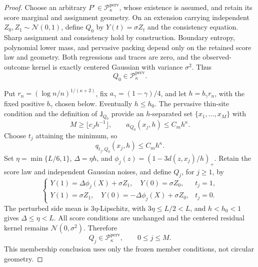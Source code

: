 \documentclass{article}
\begin{document}
\begin{proof}
Choose an arbitrary \(P^\circ\in\mathcal P_{\kappa}^{\mathrm{perv}}\),
whose existence is assumed, and retain its score marginal and assignment
geometry.  On an extension carrying independent
\(Z_0,Z_1\sim\mathcal N(0,1)\), define \(Q_0\) by
\(Y(t)=\sigma Z_t\) and the consistency equation.  Sharp assignment and
consistency hold by construction.  Boundary entropy, polynomial lower
mass, and pervasive packing depend only on the retained score law and
geometry.  Both regressions and traces are zero, and the observed-outcome
kernel is exactly centered Gaussian with variance \(\sigma^2\).  Thus
\[
 Q_0\in\mathcal P_{\kappa}^{\mathrm{perv}}.
 \tag{77}
\]

Put \(r_n=(\log n/n)^{1/(\kappa+2)}\), fix
\(a_\gamma=(1-\gamma)/4\), and let \(h=b_\gamma r_n\), with the fixed
positive \(b_\gamma\) chosen below.  Eventually \(h\le h_0\).  The
pervasive thin-site condition and the definition of \(\mathsf J_{Q_0}\)
provide an \(h\)-separated set \(\{x_1,\ldots,x_M\}\) with
\[
 M\ge\lfloor c_Jh^{-1}\rfloor,
 \qquad a_{Q_0}(x_j,h)\le C_mh^\kappa.
 \tag{78}
\]
Choose \(t_j\) attaining the minimum, so
\[
 q_{t_j,Q_0}(x_j,h)\le C_mh^\kappa.
 \tag{79}
\]
Set \(\eta=\min\{L/6,1\}\), \(\Delta=\eta h\), and
\(\phi_j(z)=(1-3d(z,x_j)/h)_+\).  Retain the score law and independent
Gaussian noises, and define \(Q_j\), for \(j\ge1\), by
\[
 \begin{cases}
 Y(1)=\Delta\phi_j(X)+\sigma Z_1,\quad Y(0)=\sigma Z_0,&t_j=1,\\
 Y(1)=\sigma Z_1,\quad Y(0)=-\Delta\phi_j(X)+\sigma Z_0,&t_j=0.
 \end{cases}
 \tag{80}
\]
The perturbed side mean is \(3\eta\)-Lipschitz, with
\(3\eta\le L/2<L\), and \(h<h_0<1\) gives
\(\Delta\le\eta<L\).  All score conditions are unchanged and the
centered residual kernel remains \(\mathcal N(0,\sigma^2)\).  Therefore
\[
 Q_j\in\mathcal P_{\kappa}^{\mathrm{perv}},
 \qquad 0\le j\le M.
 \tag{81}
\]
This membership conclusion uses only the frozen member conditions, not
circular geometry.


\end{proof}
\end{document}
